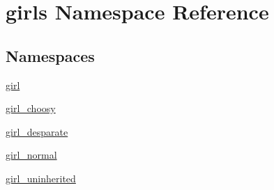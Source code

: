 \hypertarget{namespacegirls}{}\section{girls Namespace Reference}
\label{namespacegirls}
\subsection*{Namespaces}
\begin{DoxyCompactItemize}
\item 
 \hyperlink{namespacegirls_1_1girl}{girl}
\item 
 \hyperlink{namespacegirls_1_1girl__choosy}{girl\+\_\+choosy}
\item 
 \hyperlink{namespacegirls_1_1girl__desparate}{girl\+\_\+desparate}
\item 
 \hyperlink{namespacegirls_1_1girl__normal}{girl\+\_\+normal}
\item 
 \hyperlink{namespacegirls_1_1girl__uninherited}{girl\+\_\+uninherited}
\end{DoxyCompactItemize}
